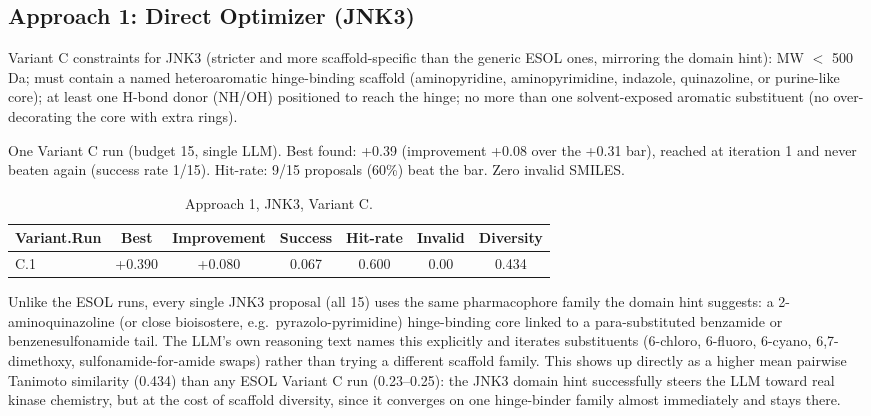 \documentclass[11pt,a4paper]{article}
\begin{document}
\subsection{Approach 1: Direct Optimizer (JNK3)}
Variant C constraints for JNK3 (stricter and more scaffold-specific than the generic ESOL ones, mirroring the domain hint): MW $<$ 500 Da; must contain a named heteroaromatic hinge-binding scaffold (aminopyridine, aminopyrimidine, indazole, quinazoline, or purine-like core); at least one H-bond donor (NH/OH) positioned to reach the hinge; no more than one solvent-exposed aromatic substituent (no over-decorating the core with extra rings).

One Variant C run (budget 15, single LLM). Best found: +0.39 (improvement +0.08 over the +0.31 bar), reached at iteration 1 and never beaten again (success rate 1/15). Hit-rate: 9/15 proposals (60\%) beat the bar. Zero invalid SMILES.

\begin{table}[h]
\centering
\begin{tabular}{lcccccc}
\hline
Variant.Run & Best & Improvement & Success & Hit-rate & Invalid & Diversity \\
\hline
C.1 & +0.390 & +0.080 & 0.067 & 0.600 & 0.00 & 0.434 \\
\hline
\end{tabular}
\caption{Approach 1, JNK3, Variant C.}
\label{tab:results_jnk3_a1}
\end{table}

Unlike the ESOL runs, every single JNK3 proposal (all 15) uses the same pharmacophore family the domain hint suggests: a 2-aminoquinazoline (or close bioisostere, e.g.\ pyrazolo-pyrimidine) hinge-binding core linked to a para-substituted benzamide or benzenesulfonamide tail. The LLM's own reasoning text names this explicitly and iterates substituents (6-chloro, 6-fluoro, 6-cyano, 6,7-dimethoxy, sulfonamide-for-amide swaps) rather than trying a different scaffold family. This shows up directly as a higher mean pairwise Tanimoto similarity (0.434) than any ESOL Variant C run (0.23--0.25): the JNK3 domain hint successfully steers the LLM toward real kinase chemistry, but at the cost of scaffold diversity, since it converges on one hinge-binder family almost immediately and stays there.
\end{document}
